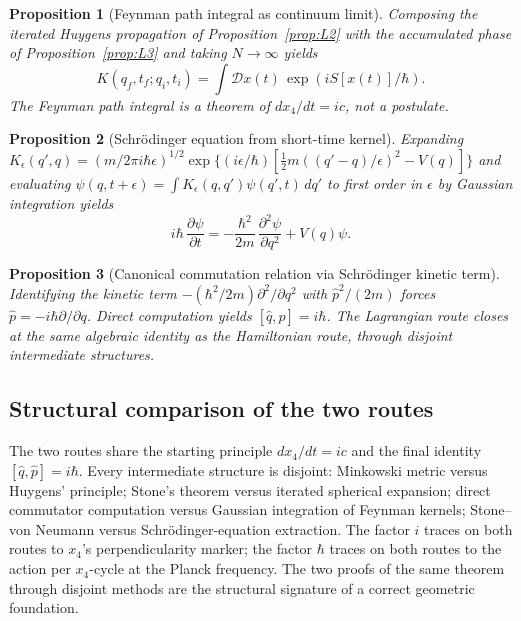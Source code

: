 \documentclass[11pt,a4paper]{article}
\newtheorem{proposition}{Proposition}
\begin{document}
\begin{proposition}[Feynman path integral as continuum limit]
\label{prop:L4}
Composing the iterated Huygens propagation of Proposition~\ref{prop:L2} with the accumulated phase of Proposition~\ref{prop:L3} and taking $N \to \infty$ yields
\begin{equation}
K(q_f, t_f; q_i, t_i) = \int \mathcal{D}x(t)\, \exp(iS[x(t)]/\hbar).
\end{equation}
The Feynman path integral is a theorem of $dx_4/dt = ic$, not a postulate.
\end{proposition}

\begin{proposition}[Schr\"odinger equation from short-time kernel]
\label{prop:L5}
Expanding $K_\epsilon(q', q) = (m/2\pi i\hbar\epsilon)^{1/2} \exp\{(i\epsilon/\hbar)[\tfrac{1}{2}m((q'-q)/\epsilon)^2 - V(q)]\}$ and evaluating $\psi(q, t+\epsilon) = \int K_\epsilon(q, q')\psi(q', t)\,dq'$ to first order in $\epsilon$ by Gaussian integration yields
\begin{equation}
i\hbar\,\frac{\partial \psi}{\partial t} = -\frac{\hbar^2}{2m}\,\frac{\partial^2 \psi}{\partial q^2} + V(q)\psi.
\end{equation}
\end{proposition}

\begin{proposition}[Canonical commutation relation via Schr\"odinger kinetic term]
\label{prop:L6}
Identifying the kinetic term $-(\hbar^2/2m) \partial^2/\partial q^2$ with $\hat{p}^2/(2m)$ forces $\hat{p} = -i\hbar \partial/\partial q$. Direct computation yields $[\hat{q}, \hat{p}] = i\hbar$. The Lagrangian route closes at the same algebraic identity as the Hamiltonian route, through disjoint intermediate structures.
\end{proposition}

\subsection{Structural comparison of the two routes}

The two routes share the starting principle $dx_4/dt = ic$ and the final identity $[\hat{q}, \hat{p}] = i\hbar$. Every intermediate structure is disjoint: Minkowski metric versus Huygens' principle; Stone's theorem versus iterated spherical expansion; direct commutator computation versus Gaussian integration of Feynman kernels; Stone--von Neumann versus Schr\"odinger-equation extraction. The factor $i$ traces on both routes to $x_4$'s perpendicularity marker; the factor $\hbar$ traces on both routes to the action per $x_4$-cycle at the Planck frequency. The two proofs of the same theorem through disjoint methods are the structural signature of a correct geometric foundation.
\end{document}
